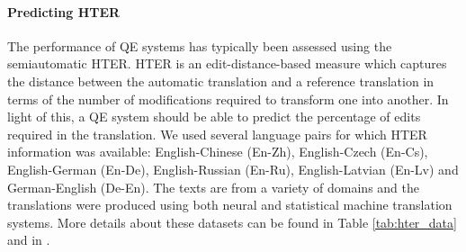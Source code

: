 \paragraph{Predicting HTER}
The performance of QE systems has typically been assessed using the semiautomatic HTER. HTER is an edit-distance-based measure which captures the distance between the automatic translation and a reference translation in terms of the number of modifications required to transform one into another. In light of this, a QE system should be able to predict the percentage of edits required in the translation. We used several language pairs for which HTER information was available: English-Chinese (En-Zh), English-Czech (En-Cs), English-German (En-De), English-Russian (En-Ru), English-Latvian (En-Lv) and German-English (De-En). The texts are from a variety of domains and the translations were produced using both neural and statistical machine translation systems. More details about these datasets can be found in Table \ref{tab:hter_data} and in \cite{specia-etal-2018-findings,fonseca-etal-2019-findings,specia-etal-2020-findings-wmt}.

